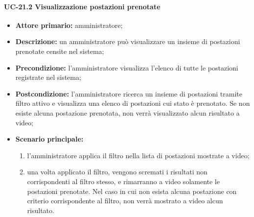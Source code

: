 \paragraph{UC-21.2 Visualizzazione postazioni prenotate}
\begin{itemize}
    \item \textbf{Attore primario:} amministratore;
    \item \textbf{Descrizione:} un amministratore pu\`{o} visualizzare un insieme di postazioni prenotate censite nel sistema;
    \item \textbf{Precondizione:} l'amministratore visualizza l'elenco di tutte le postazioni registrate nel sistema;
    \item \textbf{Postcondizione:} l'amministratore ricerca un insieme di postazioni tramite filtro attivo e visualizza una elenco di postazioni cui stato è prenotato. Se non esiste alcuna postazione prenotata, non verrà visualizzato alcun risultato a video;
    \item \textbf{Scenario principale:}
    \begin{enumerate}
        \item l'amministratore applica il filtro nella lista di postazioni mostrate a video;
        \item una volta applicato il filtro, vengono scremati i risultati non corrispondenti al filtro stesso, e rimarranno a video solamente le postazioni prenotate. Nel caso in cui non esista alcuna postazione con criterio corrispondente al filtro, non verrà mostrato a video alcun risultato.
    \end{enumerate}
\end{itemize}

